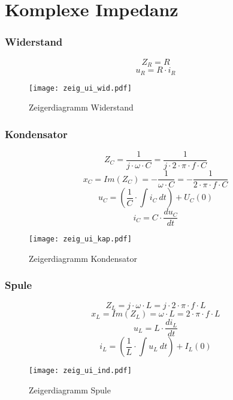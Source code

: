 



\section{Komplexe Impedanz}

\subsubsection{Widerstand}
\[ Z_R = R \]
\[ u_R = R \cdot i_R \]
\begin{figure}[h!]
	\centering
	\texttt{[image: zeig\_ui\_wid.pdf]}
	\caption{Zeigerdiagramm Widerstand}
	\label{fig:zeig_ui_wid}
\end{figure}

\newpage
\subsubsection{Kondensator}
\[ Z_C = \frac{1}{j \cdot \omega \cdot C} 
= \frac{1}{j \cdot 2 \cdot \pi \cdot f \cdot C} \]
\[ x_C = Im(Z_C) = -\frac{1}{\omega \cdot C} 
= -\frac{1}{2 \cdot \pi \cdot f \cdot C} \]
\[ u_C = \left( \frac{1}{C} \cdot \int i_C ~ dt \right) + U_C(0) \]
\[ i_C = C \cdot \frac{du_C}{dt} \]
\begin{figure}[h!]
	\centering
	\texttt{[image: zeig\_ui\_kap.pdf]}
	\caption{Zeigerdiagramm Kondensator}
	\label{fig:zeig_ui_kap}
\end{figure}

\subsubsection{Spule}
\[ Z_L = j \cdot \omega \cdot L = j \cdot 2 \cdot \pi \cdot f \cdot L \]
\[ x_L = Im(Z_L) = \omega \cdot L = 2 \cdot \pi \cdot f \cdot L \]
\[ u_L = L \cdot \frac{di_L}{dt} \]
\[ i_L = \left( \frac{1}{L} \cdot \int u_L ~ dt \right) + I_L(0) \]
\begin{figure}[h!]
	\centering
	\texttt{[image: zeig\_ui\_ind.pdf]}
	\caption{Zeigerdiagramm Spule}
	\label{fig:zeig_ui_ind}
\end{figure}
